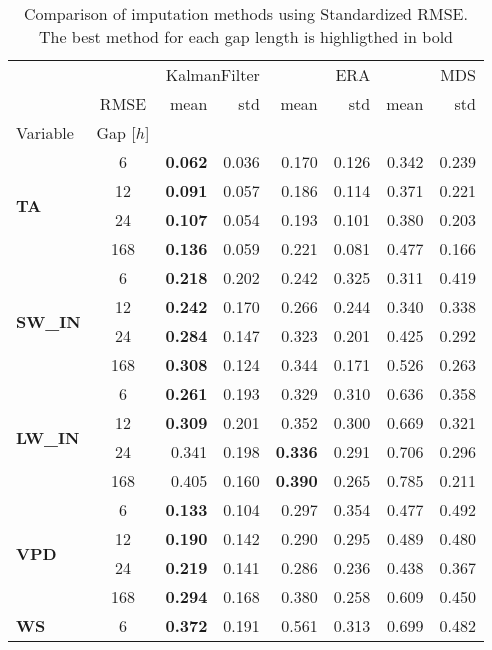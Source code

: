 \begin{table}
\centering
\caption{Comparison of imputation methods using Standardized RMSE. The best method for each gap length is highligthed in bold}
\label{the_table_stand}
\begin{tabular}{p{2.1cm}c|rr|rr|rr}
\toprule
 &  & \multicolumn{2}{r}{KalmanFilter} & \multicolumn{2}{r}{ERA} & \multicolumn{2}{r}{MDS} \\
 & RMSE & mean & std & mean & std & mean & std \\
Variable & Gap [$h$] &  &  &  &  &  &  \\
\midrule
\multirow[c]{4}{*}{\parbox{2.1cm}{\textbf{TA}}} & 6 & \bfseries 0.062 & 0.036 & 0.170 & 0.126 & 0.342 & 0.239 \\
 & 12 & \bfseries 0.091 & 0.057 & 0.186 & 0.114 & 0.371 & 0.221 \\
 & 24 & \bfseries 0.107 & 0.054 & 0.193 & 0.101 & 0.380 & 0.203 \\
 & 168 & \bfseries 0.136 & 0.059 & 0.221 & 0.081 & 0.477 & 0.166 \\
\cline{1-8}
\multirow[c]{4}{*}{\parbox{2.1cm}{\textbf{SW\_IN}}} & 6 & \bfseries 0.218 & 0.202 & 0.242 & 0.325 & 0.311 & 0.419 \\
 & 12 & \bfseries 0.242 & 0.170 & 0.266 & 0.244 & 0.340 & 0.338 \\
 & 24 & \bfseries 0.284 & 0.147 & 0.323 & 0.201 & 0.425 & 0.292 \\
 & 168 & \bfseries 0.308 & 0.124 & 0.344 & 0.171 & 0.526 & 0.263 \\
\cline{1-8}
\multirow[c]{4}{*}{\parbox{2.1cm}{\textbf{LW\_IN}}} & 6 & \bfseries 0.261 & 0.193 & 0.329 & 0.310 & 0.636 & 0.358 \\
 & 12 & \bfseries 0.309 & 0.201 & 0.352 & 0.300 & 0.669 & 0.321 \\
 & 24 & 0.341 & 0.198 & \bfseries 0.336 & 0.291 & 0.706 & 0.296 \\
 & 168 & 0.405 & 0.160 & \bfseries 0.390 & 0.265 & 0.785 & 0.211 \\
\cline{1-8}
\multirow[c]{4}{*}{\parbox{2.1cm}{\textbf{VPD}}} & 6 & \bfseries 0.133 & 0.104 & 0.297 & 0.354 & 0.477 & 0.492 \\
 & 12 & \bfseries 0.190 & 0.142 & 0.290 & 0.295 & 0.489 & 0.480 \\
 & 24 & \bfseries 0.219 & 0.141 & 0.286 & 0.236 & 0.438 & 0.367 \\
 & 168 & \bfseries 0.294 & 0.168 & 0.380 & 0.258 & 0.609 & 0.450 \\
\cline{1-8}
\multirow[c]{4}{*}{\parbox{2.1cm}{\textbf{WS}}} & 6 & \bfseries 0.372 & 0.191 & 0.561 & 0.313 & 0.699 & 0.482 \\

\end{tabular}
\end{table}
